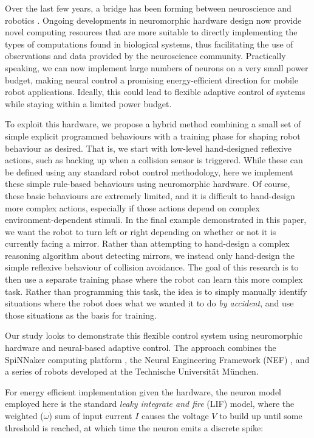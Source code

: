 \documentclass[conference]{IEEEtran}
\begin{document}
Over the last few years, a bridge has been forming between neuroscience and 
robotics \cite{krichmar2011}. Ongoing developments in neuromorphic hardware 
design now provide novel computing resources that are more suitable to
directly implementing the types of computations found in biological systems, 
thus facilitating the use of observations and data provided by the 
neuroscience community. Practically speaking, we can now implement large numbers of 
neurons on a very small power budget, making neural control a promising 
energy-efficient direction for mobile robot applications.  Ideally, this could
lead to flexible adaptive control of systems while staying within a limited
power budget.

To exploit this hardware, we propose a hybrid method combining a small set of
simple explicit programmed behaviours with a training phase for shaping robot
behaviour as desired.  That is, we start with low-level hand-designed reflexive
actions, such as backing up when a collision sensor is triggered.  While these can be defined using
any standard robot control methodology, here we implement these simple rule-based
behaviours using neuromorphic hardware.  Of course, these basic behaviours
are extremely limited, and it is difficult to hand-design more complex actions,
especially if those actions depend on complex environment-dependent stimuli.
In the final example demonstrated in this paper, we want the robot to turn
left or right depending on whether or not it is currently facing a mirror.
Rather than attempting to hand-design a complex reasoning algorithm about detecting
mirrors, we instead only hand-design the simple reflexive behaviour of collision
avoidance.  The goal of this research is to then use a separate training phase
where the robot can learn this more complex task.  Rather than programming this
task, the idea is to simply manually identify situations where the robot
does what we wanted it to do \textit{by accident}, and use those situations as
the basis for training.

Our study looks to demonstrate this flexible control system using 
neuromorphic hardware and neural-based adaptive control. The approach 
combines the SpiNNaker computing 
platform \cite{furber2007neural, furber2014spinnaker}, the Neural Engineering 
Framework (NEF)  \cite{eliasmith2004neural}, and a series of robots developed at 
the Technische Universit{\"a}t M{\"u}nchen. 


For energy efficient implementation given the hardware, the neuron model
employed here is the standard \textit{leaky integrate and fire} (LIF) model, 
where the weighted ($\omega$) sum of input current $I$ causes the voltage $V$ to build up until some
threshold is reached, at which time the neuron emits a discrete spike:
\end{document}

